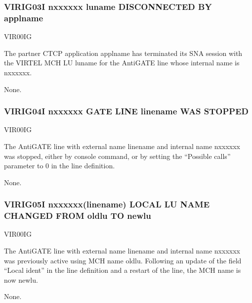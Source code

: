 \documentclass[letterpaper,10pt,english]{sphinxmanual}
\begin{document}
\subsubsection{VIRIG03I n\sphinxhyphen{}xxxxxx luname DISCONNECTED BY applname}
\label{\detokenize{messages:virig03i-n-xxxxxx-luname-disconnected-by-applname}}\begin{description}
\sphinxAtStartPar
VIR00IG

\sphinxAtStartPar
The partner CTCP application applname has terminated its SNA session with the VIRTEL MCH LU luname for the AntiGATE line whose internal name is n\sphinxhyphen{}xxxxxx.

\sphinxAtStartPar
None.

\end{description}


\subsubsection{VIRIG04I n\sphinxhyphen{}xxxxxx GATE LINE linename WAS STOPPED}
\label{\detokenize{messages:virig04i-n-xxxxxx-gate-line-linename-was-stopped}}\begin{description}
\sphinxAtStartPar
VIR00IG

\sphinxAtStartPar
The AntiGATE line with external name linename and internal name n\sphinxhyphen{}xxxxxx was stopped, either by console command, or by setting the “Possible calls” parameter to 0 in the line definition.

\sphinxAtStartPar
None.

\end{description}


\subsubsection{VIRIG05I n\sphinxhyphen{}xxxxxx(linename) LOCAL LU NAME CHANGED FROM oldlu TO newlu}
\label{\detokenize{messages:virig05i-n-xxxxxx-linename-local-lu-name-changed-from-oldlu-to-newlu}}\begin{description}
\sphinxAtStartPar
VIR00IG

\sphinxAtStartPar
The AntiGATE line with external name linename and internal name n\sphinxhyphen{}xxxxxx was previously active using MCH name oldlu. Following an update of the field “Local ident” in the line definition and a restart of the line, the MCH name is now newlu.

\sphinxAtStartPar
None.

\end{description}
\end{document}
